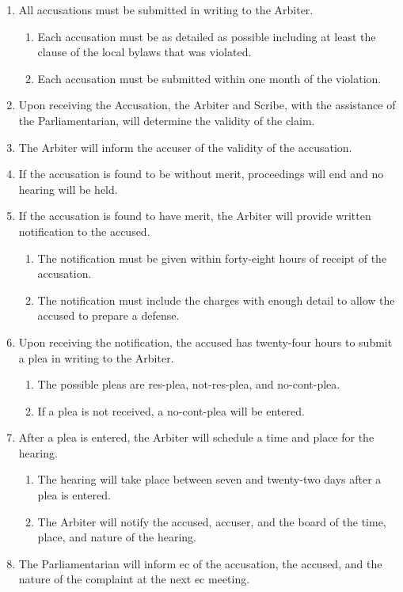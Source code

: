 	\begin{enumerate}
		\item All accusations must be submitted in writing to the Arbiter. 
			\begin{enumerate}
				\item Each accusation must be as detailed as possible including at least the clause of the local bylaws that was violated.
				\item Each accusation must be submitted within one month of the violation.
			\end{enumerate}

		\item Upon receiving the Accusation, the Arbiter and Scribe, with the assistance of the Parliamentarian, will determine the validity of the claim.
		\item The Arbiter will inform the accuser of the validity of the accusation.
		\item If the accusation is found to be without merit, proceedings will end and no hearing will be held.
		\item If the accusation is found to have merit, the Arbiter will provide written notification to the accused.
			\begin{enumerate}
				\item The notification must be given within forty-eight hours of receipt of the accusation.
				\item The notification must include the charges with enough detail to allow the accused to prepare a defense.
			\end{enumerate}
		\item Upon receiving the notification, the accused has twenty-four hours to submit a plea in writing to the Arbiter.
			\begin{enumerate}
				\item The possible pleas are \gls{res-plea}, \gls{not-res-plea}, and \gls{no-cont-plea}.
				\item If a plea is not received, a \gls{no-cont-plea} will be entered.
			\end{enumerate}

		\item After a plea is entered, the Arbiter will schedule a time and place for the hearing.
			\begin{enumerate}
				\item The hearing will take place between seven and twenty-two days after a plea is entered.
				\item The Arbiter will notify the accused, accuser, and the board of the time, place, and nature of the hearing.
			\end{enumerate}

		\item The Parliamentarian will inform \gls{ec} of the accusation, the accused, and the nature of the complaint at the next \gls{ec} meeting.

	\end{enumerate}

